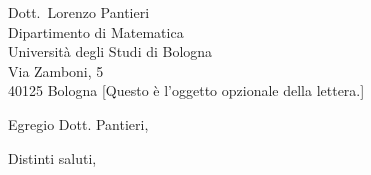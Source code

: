 \documentclass[shortindent]{letteracdp}
\begin{document}
\address{
Dott. Matteo Sostero \\
via Torricelle, 7 \\
36060 Romano d'Ezzelino (\textsc{vi})
}

\signature{\texttt{[image: firma.pdf]} \\ Matteo Sostero}

\date{\today} %

\begin{letter}{
Dott.~Lorenzo Pantieri\\
Dipartimento di Matematica\\
Università degli Studi di Bologna\\
Via Zamboni, 5\\
40125 Bologna
}
[Questo è l’oggetto opzionale della lettera.]

\opening{Egregio Dott. Pantieri,}

\lipsum[1]

\lipsum[2]

\closing{Distinti saluti,}

\end{letter}
\end{document}
